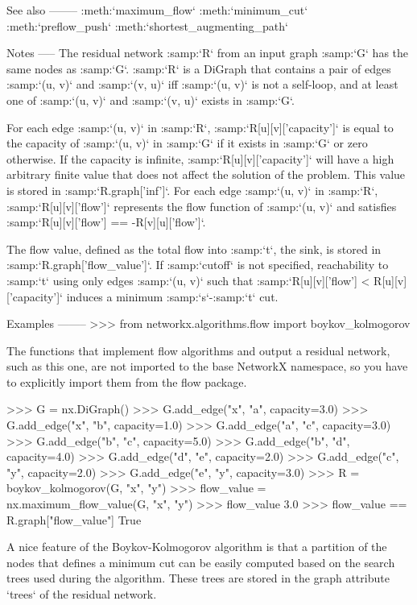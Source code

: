 \begin{DoxyVerb}
See also
--------
:meth:`maximum_flow`
:meth:`minimum_cut`
:meth:`preflow_push`
:meth:`shortest_augmenting_path`

Notes
-----
The residual network :samp:`R` from an input graph :samp:`G` has the
same nodes as :samp:`G`. :samp:`R` is a DiGraph that contains a pair
of edges :samp:`(u, v)` and :samp:`(v, u)` iff :samp:`(u, v)` is not a
self-loop, and at least one of :samp:`(u, v)` and :samp:`(v, u)` exists
in :samp:`G`.

For each edge :samp:`(u, v)` in :samp:`R`, :samp:`R[u][v]['capacity']`
is equal to the capacity of :samp:`(u, v)` in :samp:`G` if it exists
in :samp:`G` or zero otherwise. If the capacity is infinite,
:samp:`R[u][v]['capacity']` will have a high arbitrary finite value
that does not affect the solution of the problem. This value is stored in
:samp:`R.graph['inf']`. For each edge :samp:`(u, v)` in :samp:`R`,
:samp:`R[u][v]['flow']` represents the flow function of :samp:`(u, v)` and
satisfies :samp:`R[u][v]['flow'] == -R[v][u]['flow']`.

The flow value, defined as the total flow into :samp:`t`, the sink, is
stored in :samp:`R.graph['flow_value']`. If :samp:`cutoff` is not
specified, reachability to :samp:`t` using only edges :samp:`(u, v)` such
that :samp:`R[u][v]['flow'] < R[u][v]['capacity']` induces a minimum
:samp:`s`-:samp:`t` cut.

Examples
--------
>>> from networkx.algorithms.flow import boykov_kolmogorov

The functions that implement flow algorithms and output a residual
network, such as this one, are not imported to the base NetworkX
namespace, so you have to explicitly import them from the flow package.

>>> G = nx.DiGraph()
>>> G.add_edge("x", "a", capacity=3.0)
>>> G.add_edge("x", "b", capacity=1.0)
>>> G.add_edge("a", "c", capacity=3.0)
>>> G.add_edge("b", "c", capacity=5.0)
>>> G.add_edge("b", "d", capacity=4.0)
>>> G.add_edge("d", "e", capacity=2.0)
>>> G.add_edge("c", "y", capacity=2.0)
>>> G.add_edge("e", "y", capacity=3.0)
>>> R = boykov_kolmogorov(G, "x", "y")
>>> flow_value = nx.maximum_flow_value(G, "x", "y")
>>> flow_value
3.0
>>> flow_value == R.graph["flow_value"]
True

A nice feature of the Boykov-Kolmogorov algorithm is that a partition
of the nodes that defines a minimum cut can be easily computed based
on the search trees used during the algorithm. These trees are stored
in the graph attribute `trees` of the residual network.


\end{DoxyVerb}
